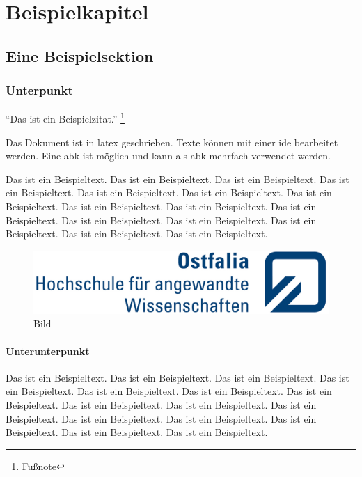 \chapter{Beispielkapitel}

\section{Eine Beispielsektion}

\subsection{Unterpunkt}

\enquote{Das ist ein Beispielzitat.} \footnote{Fußnote}

Das Dokument ist in \Gls{latex} geschrieben.
Texte können mit einer \gls{ide} bearbeitet werden.
Eine \gls{abk} ist möglich und kann als \gls{abk} mehrfach verwendet werden.

Das ist ein Beispieltext. Das ist ein Beispieltext. Das ist ein Beispieltext. Das ist ein Beispieltext. Das ist ein Beispieltext. Das ist ein Beispieltext. Das ist ein Beispieltext. Das ist ein Beispieltext. Das ist ein Beispieltext. Das ist ein Beispieltext. Das ist ein Beispieltext. Das ist ein Beispieltext. Das ist ein Beispieltext. Das ist ein Beispieltext. Das ist ein Beispieltext.

\begin{figure}
	\centering
	\includegraphics{./images/logos/logo_ostfalia.jpg}
	\caption{Bild}
\end{figure}

\subsubsection{Unterunterpunkt}
Das ist ein Beispieltext. Das ist ein Beispieltext. Das ist ein Beispieltext. Das ist ein Beispieltext. Das ist ein Beispieltext. Das ist ein Beispieltext. Das ist ein Beispieltext. Das ist ein Beispieltext. Das ist ein Beispieltext. Das ist ein Beispieltext. Das ist ein Beispieltext. Das ist ein Beispieltext. Das ist ein Beispieltext. Das ist ein Beispieltext. Das ist ein Beispieltext.

